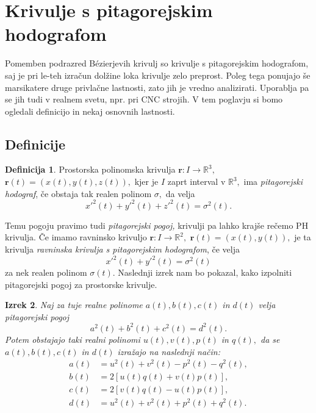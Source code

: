 \documentclass[12pt,a4paper,twoside]{article}
\theoremstyle{definition} %
\newtheorem{definicija}{Definicija}[section]
\theoremstyle{plain} %
\newtheorem{izrek}[definicija]{Izrek}
\theoremstyle{primerstyle}
\numberwithin{equation}{section}  %
\newcommand{\R}{\mathbb R}
\newcommand{\rV}{\mathbf{r}}
\begin{document}
\section{Krivulje s pitagorejskim hodografom}

Pomemben podrazred Bézierjevih krivulj so krivulje s pitagorejskim hodografom, saj je pri le-teh izračun dolžine loka krivulje zelo preprost. Poleg tega ponujajo še marsikatere druge privlačne lastnosti, zato jih je vredno analizirati. Uporablja pa se jih tudi v realnem svetu, npr. pri CNC strojih. V tem poglavju si bomo ogledali definicijo in nekaj osnovnih lastnosti.

\subsection{Definicije}

\begin{definicija}
	Prostorska polinomska krivulja $\rV:I \to \R^3,$ $\rV(t)=(x(t),y(t),z(t)),$ kjer je $I$ zaprt interval v $\R^3,$ ima \emph{pitagorejski hodograf}, če obstaja tak realen polinom $\sigma,$ da velja
	\begin{equation}
		\label{pitagorejski}
		x'^2(t)+y'^2(t)+z'^2(t)=\sigma^2(t).
	\end{equation}
\end{definicija}

Temu pogoju pravimo tudi \emph{pitagorejski pogoj,} krivulji pa lahko krajše rečemo PH krivulja. Če imamo ravninsko krivuljo $\rV:I \to \R^2,$ $\rV(t)=(x(t),y(t)),$ je ta krivulja \emph{ravninska krivulja s pitagorejskim hodografom}, če velja
\begin{equation}
	\label{ravninski_pitagorejski}
	x'^2(t)+y'^2(t)=\sigma^2(t)
\end{equation}
za nek realen polinom $\sigma(t).$ Naslednji izrek nam bo pokazal, kako izpolniti pitagorejski pogoj za prostorske krivulje.
\begin{izrek}
	\label{PH_pogoj_izrek}
	Naj za tuje realne polinome $a(t),b(t),c(t)$ in $d(t)$ velja pitagorejski pogoj
	\begin{equation}
		\label{pogoj_izrek4_2}
		a^2(t)+b^2(t)+c^2(t)=d^2(t).
	\end{equation}
	Potem obstajajo taki realni polinomi $u(t),v(t),p(t)$ in $q(t),$ da se $a(t),b(t),c(t)$ in $d(t)$ izražajo na naslednji način:
	\begin{align}
		a(t)&=u^2(t)+v^2(t)-p^2(t)-q^2(t), \nonumber \\
		b(t)&=2[u(t)q(t)+v(t)p(t)], \label{izrek4_3} \\
		c(t)&=2[v(t)q(t)-u(t)p(t)], \nonumber \\
		d(t)&=u^2(t)+v^2(t)+p^2(t)+q^2(t). \nonumber
	\end{align}
\end{izrek}
\end{document}
